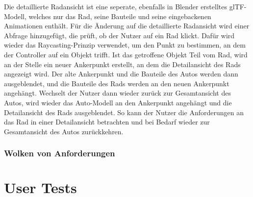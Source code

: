 Die detaillierte Radansicht ist eine seperate, ebenfalls in Blender erstelltes glTF-Modell, welches nur das Rad, seine Bauteile und seine eingebackenen Animationen enthält.
Für die Änderung auf die detaillierte Radansicht wird einer Abfrage hinzugefügt, die prüft, ob der Nutzer auf ein Rad klickt.
Dafür wird wieder das Raycasting-Prinzip verwendet, um den Punkt zu bestimmen, an dem der Controller auf ein Objekt trifft.
Ist das getroffene Objekt Teil vom Rad, wird an der Stelle ein neuer Ankerpunkt erstellt, an dem die Detailansicht des Rads angezeigt wird.
Der alte Ankerpunkt und die Bauteile des Autos werden dann ausgeblendet, und die Bauteile des Rads werden an den neuen Ankerpunkt angehängt.
Wechselt der Nutzer dann wieder zurück zur Gesamtansicht des Autos, wird wieder das Auto-Modell an den Ankerpunkt angehängt und die Detailansicht des Rads ausgeblendet.
So kann der Nutzer die Anforderungen an das Rad in einer Detailansicht betrachten und bei Bedarf wieder zur Gesamtansicht des Autos zurückkehren.





\subsubsection{Wolken von Anforderungen}

\section{User Tests}